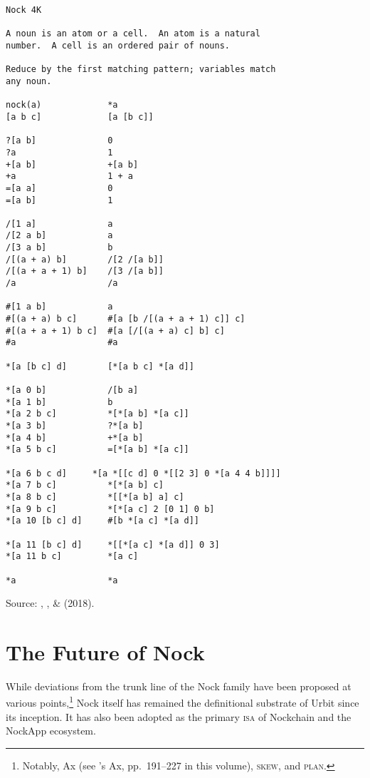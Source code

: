 \documentclass[twoside]{article}
\begin{document}
\begin{lstlisting}[label=lst:nock4k,caption={Nock 4K, \textit{terminus ad quem} 27 September 2018.},style=listingcode]
Nock 4K

A noun is an atom or a cell.  An atom is a natural
number.  A cell is an ordered pair of nouns.

Reduce by the first matching pattern; variables match
any noun.

nock(a)             *a
[a b c]             [a [b c]]

?[a b]              0
?a                  1
+[a b]              +[a b]
+a                  1 + a
=[a a]              0
=[a b]              1

/[1 a]              a
/[2 a b]            a
/[3 a b]            b
/[(a + a) b]        /[2 /[a b]]
/[(a + a + 1) b]    /[3 /[a b]]
/a                  /a

#[1 a b]            a
#[(a + a) b c]      #[a [b /[(a + a + 1) c]] c]
#[(a + a + 1) b c]  #[a [/[(a + a) c] b] c]
#a                  #a

*[a [b c] d]        [*[a b c] *[a d]]

*[a 0 b]            /[b a]
*[a 1 b]            b
*[a 2 b c]          *[*[a b] *[a c]]
*[a 3 b]            ?*[a b]
*[a 4 b]            +*[a b]
*[a 5 b c]          =[*[a b] *[a c]]

*[a 6 b c d]     *[a *[[c d] 0 *[[2 3] 0 *[a 4 4 b]]]]
*[a 7 b c]          *[*[a b] c]
*[a 8 b c]          *[[*[a b] a] c]
*[a 9 b c]          *[*[a c] 2 [0 1] 0 b]
*[a 10 [b c] d]     #[b *[a c] *[a d]]

*[a 11 [b c] d]     *[[*[a c] *[a d]] 0 3]
*[a 11 b c]         *[a c]

*a                  *a
\end{lstlisting}

Source:  , , \&  (2018). %

\section{The Future of Nock}

While deviations from the trunk line of the Nock family have been proposed at various points,\footnote{Notably, Ax (see 's Ax, pp.~191–227 in this volume), \textsc{skew}, and \textsc{plan}.} Nock itself has remained the definitional substrate of Urbit since its inception.  It has also been adopted as the primary \textsc{isa} of Nockchain and the NockApp ecosystem.
\end{document}
